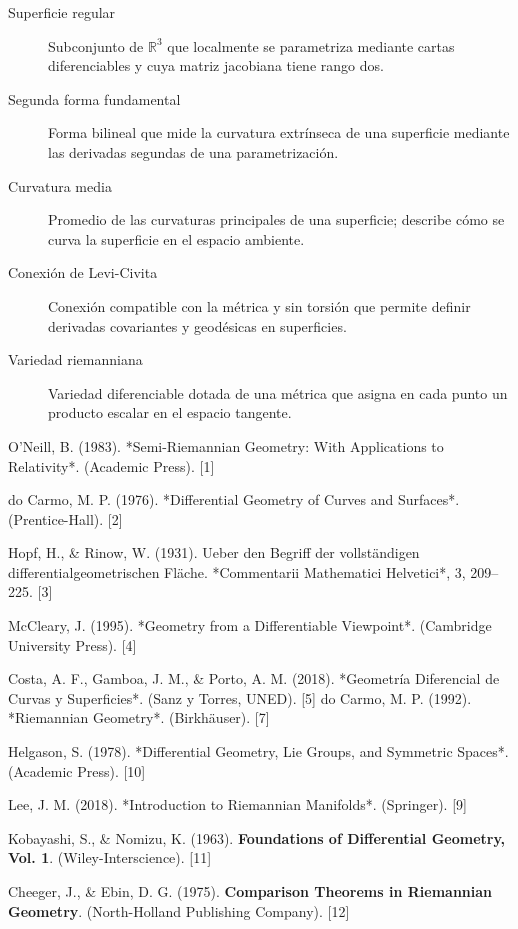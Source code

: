 \documentclass[12pt, a4paper]{report}
\theoremstyle{miestilo}
\theoremstyle{midefinicion}
\begin{document}
\begin{description}
  \item[Superficie regular] Subconjunto de $\mathbb{R}^3$ que localmente se parametriza mediante cartas diferenciables y cuya matriz jacobiana tiene rango dos.
  \item[Segunda forma fundamental] Forma bilineal que mide la curvatura extrínseca de una superficie mediante las derivadas segundas de una parametrización.
  \item[Curvatura media] Promedio de las curvaturas principales de una superficie; describe cómo se curva la superficie en el espacio ambiente.
  \item[Conexión de Levi-Civita] Conexión compatible con la métrica y sin torsión que permite definir derivadas covariantes y geodésicas en superficies.
  \item[Variedad riemanniana] Variedad diferenciable dotada de una métrica que asigna en cada punto un producto escalar en el espacio tangente.
\end{description}

\begin{thebibliography}{9}

O'Neill, B. (1983). *Semi-Riemannian Geometry: With Applications to Relativity*. (Academic Press). [1]

do Carmo, M. P. (1976). *Differential Geometry of Curves and Surfaces*. (Prentice-Hall). [2]

Hopf, H., \& Rinow, W. (1931). Ueber den Begriff der vollständigen differentialgeometrischen Fläche. *Commentarii Mathematici Helvetici*, 3, 209–225. [3]

McCleary, J. (1995). *Geometry from a Differentiable Viewpoint*. (Cambridge University Press). [4]

Costa, A. F., Gamboa, J. M., \& Porto, A. M. (2018). *Geometría Diferencial de Curvas y Superficies*. (Sanz y Torres, UNED). [5]
do Carmo, M. P. (1992). *Riemannian Geometry*. (Birkhäuser). [7]

Helgason, S. (1978). *Differential Geometry, Lie Groups, and Symmetric Spaces*. (Academic Press). [10]

Lee, J. M. (2018). *Introduction to Riemannian Manifolds*. (Springer). [9]

Kobayashi, S., & Nomizu, K. (1963). \textbf{Foundations of Differential Geometry, Vol. 1}. (Wiley-Interscience). [11]

Cheeger, J., & Ebin, D. G. (1975). \textbf{Comparison Theorems in Riemannian Geometry}. (North-Holland Publishing Company). [12]

\end{thebibliography}
\end{document}
